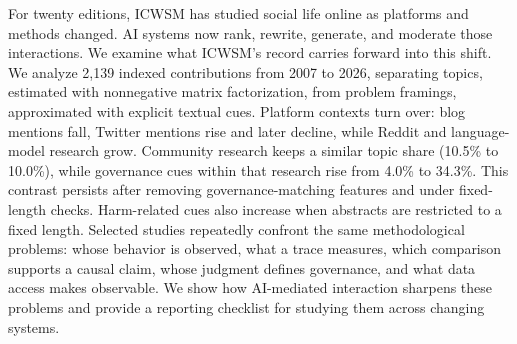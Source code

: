 For twenty editions, ICWSM has studied social life online as platforms and methods changed. AI systems now rank, rewrite, generate, and moderate those interactions. We examine what ICWSM's record carries forward into this shift. We analyze 2,139 indexed contributions from 2007 to 2026, separating topics, estimated with nonnegative matrix factorization, from problem framings, approximated with explicit textual cues. Platform contexts turn over: blog mentions fall, Twitter mentions rise and later decline, while Reddit and language-model research grow. Community research keeps a similar topic share (10.5\% to 10.0\%), while governance cues within that research rise from 4.0\% to 34.3\%. This contrast persists after removing governance-matching features and under fixed-length checks. Harm-related cues also increase when abstracts are restricted to a fixed length. Selected studies repeatedly confront the same methodological problems: whose behavior is observed, what a trace measures, which comparison supports a causal claim, whose judgment defines governance, and what data access makes observable. We show how AI-mediated interaction sharpens these problems and provide a reporting checklist for studying them across changing systems.
